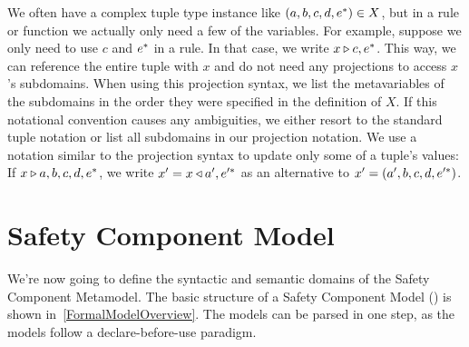 \documentclass[a4paper,10pt,english]{article}
\begin{document}
	We often have a complex tuple type instance like $(a, b, c, d, e^*) \in X$, but in a rule or
	function we actually only need a few of the variables. For example, suppose we only need to use $c$ and $e^*$ in a rule. In that case,
	we write $x \triangleright c, e^*$.
	This way, we can reference the entire tuple with $x$ and do not need any projections to access $x$'s subdomains. When using this projection syntax, we list the
	metavariables of the subdomains in the order they were specified in the definition of $X$. If this notational convention causes any ambiguities, we either
	resort to the standard tuple notation or list all subdomains in our projection notation. We use a notation similar to the
	projection syntax to update only some of a tuple's values: If $x \triangleright a, b, c, d, e^*$, we write $x' = x
	\triangleleft a', e'^*$ as an alternative to $x' = (a', b, c, d, e'^*)$.  

\section{Safety Component Model}
We're now going to define the syntactic and semantic
domains of the Safety Component Metamodel. The basic structure of a Safety Component Model (\Scm) is shown
in~\cref{FormalModelOverview}.
The models can be parsed in one step, as the models follow a declare-before-use paradigm.
\end{document}
